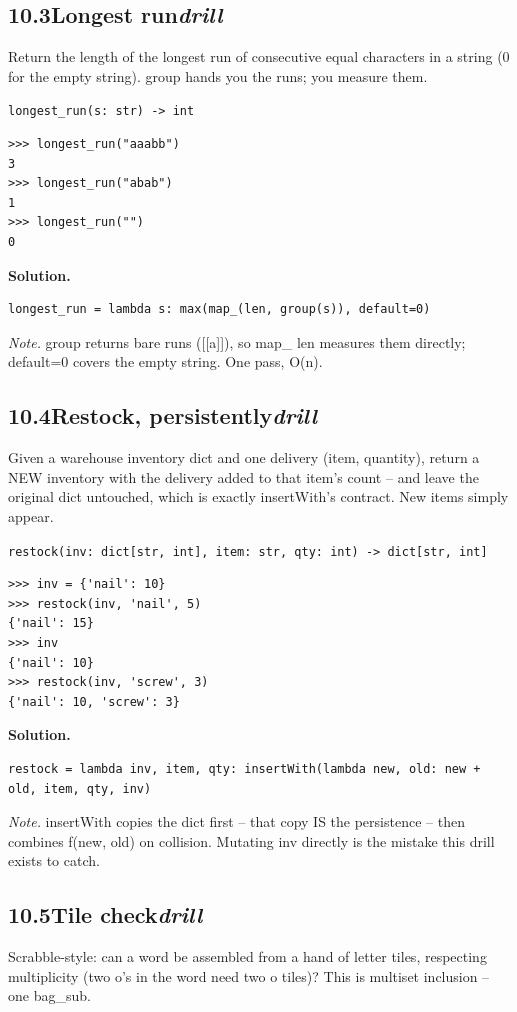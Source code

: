 \documentclass[10pt,letterpaper]{book}
\begin{document}
\subsection*{10.3\quad Longest run\hfill\textnormal{\textit{drill}}}
Return the length of the longest run of consecutive equal characters in a string (0 for the empty string). group hands you the runs; you measure them.

\noindent\texttt{longest\_run(s: str) -> int}
\begin{lstlisting}[style=ex]
>>> longest_run("aaabb")
3
>>> longest_run("abab")
1
>>> longest_run("")
0
\end{lstlisting}
\noindent\textbf{Solution.}
\begin{lstlisting}[style=code]
longest_run = lambda s: max(map_(len, group(s)), default=0)
\end{lstlisting}
\noindent\textit{Note.} group returns bare runs ([[a]]), so map\_ len measures them directly; default=0 covers the empty string. One pass, O(n).

\subsection*{10.4\quad Restock, persistently\hfill\textnormal{\textit{drill}}}
Given a warehouse inventory dict and one delivery (item, quantity), return a NEW inventory with the delivery added to that item's count -- and leave the original dict untouched, which is exactly insertWith's contract. New items simply appear.

\noindent\texttt{restock(inv: dict[str, int], item: str, qty: int) -> dict[str, int]}
\begin{lstlisting}[style=ex]
>>> inv = {'nail': 10}
>>> restock(inv, 'nail', 5)
{'nail': 15}
>>> inv
{'nail': 10}
>>> restock(inv, 'screw', 3)
{'nail': 10, 'screw': 3}
\end{lstlisting}
\noindent\textbf{Solution.}
\begin{lstlisting}[style=code]
restock = lambda inv, item, qty: insertWith(lambda new, old: new + old, item, qty, inv)
\end{lstlisting}
\noindent\textit{Note.} insertWith copies the dict first -- that copy IS the persistence -- then combines f(new, old) on collision. Mutating inv directly is the mistake this drill exists to catch.

\subsection*{10.5\quad Tile check\hfill\textnormal{\textit{drill}}}
Scrabble-style: can a word be assembled from a hand of letter tiles, respecting multiplicity (two o's in the word need two o tiles)? This is multiset inclusion -- one bag\_sub.
\end{document}
